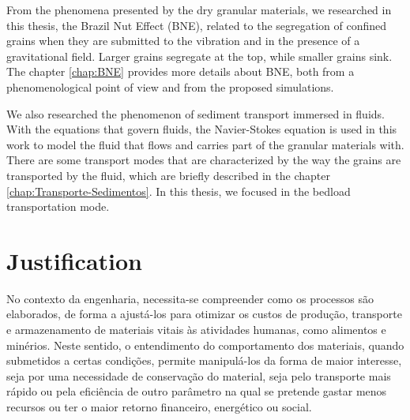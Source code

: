 
    From the phenomena presented by the dry granular materials, we researched in this thesis, the Brazil Nut Effect (BNE), related to the segregation of confined grains when they are submitted to the vibration and in the presence of a gravitational field. Larger grains segregate at the top, while smaller grains sink. The chapter \ref{chap:BNE} provides more details about BNE, both from a phenomenological point of view and from the proposed simulations.


    We also researched the phenomenon of sediment transport immersed in fluids. With the equations that govern fluids, the Navier-Stokes \cite{Physical_Hydrodynamics, Fluid_Mechanics} equation is used in this work to model the fluid that flows and carries part of the granular materials with. There are some transport modes that are characterized by the way the grains are transported by the fluid, which are briefly described in the chapter \ref{chap:Transporte-Sedimentos}. In this thesis, we focused in the bedload transportation mode.

\section{Justification}
\label{sec:justificativa}

    No contexto da engenharia, necessita-se compreender como os processos são elaborados, de forma a ajustá-los para otimizar os custos de produção, transporte e armazenamento de materiais vitais às atividades humanas, como alimentos e minérios. Neste sentido, o entendimento do comportamento dos materiais, quando submetidos a certas condições, permite manipulá-los da forma de maior interesse, seja por uma necessidade de conservação do material, seja pelo transporte mais rápido ou pela eficiência de outro parâmetro na qual se pretende gastar menos recursos ou ter o maior retorno financeiro, energético ou social.

